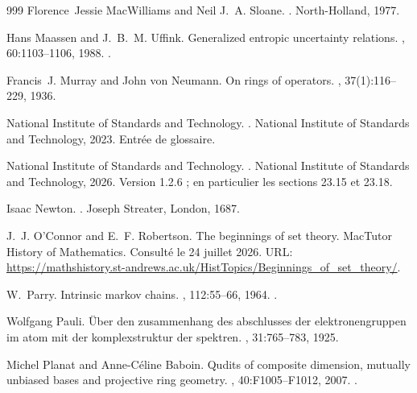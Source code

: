 \begin{thebibliography}{999}
Florence~Jessie MacWilliams and Neil J.~A. Sloane.
.
\newblock North-Holland, 1977.

Hans Maassen and J.~B.~M. Uffink.
\newblock Generalized entropic uncertainty relations.
, 60:1103--1106, 1988.
\newblock \href {https://doi.org/10.1103/PhysRevLett.60.1103}
  {}.

Francis~J. Murray and John von Neumann.
\newblock On rings of operators.
, 37(1):116--229, 1936.

{National Institute of Standards and Technology}.
.
\newblock National Institute of Standards and Technology, 2023.
\newblock Entrée de glossaire.

{National Institute of Standards and Technology}.
.
\newblock National Institute of Standards and Technology, 2026.
\newblock Version 1.2.6 ; en particulier les sections 23.15 et 23.18.

Isaac Newton.
.
\newblock Joseph Streater, London, 1687.

J.~J. O'Connor and E.~F. Robertson.
\newblock The beginnings of set theory.
\newblock MacTutor History of Mathematics.
\newblock Consulté le 24 juillet 2026.
\newblock URL:
  \url{https://mathshistory.st-andrews.ac.uk/HistTopics/Beginnings_of_set_theory/}.

W.~Parry.
\newblock Intrinsic markov chains.
, 112:55--66,
  1964.
\newblock \href {https://doi.org/10.1090/S0002-9947-1964-0161372-1}
  {}.

Wolfgang Pauli.
\newblock Über den zusammenhang des abschlusses der elektronengruppen im atom
  mit der komplexstruktur der spektren.
, 31:765--783, 1925.

Michel Planat and Anne-C{\'e}line Baboin.
\newblock Qudits of composite dimension, mutually unbiased bases and projective
  ring geometry.
,
  40:F1005--F1012, 2007.
\newblock \href {https://arxiv.org/abs/0709.2623} {}.


\end{thebibliography}

